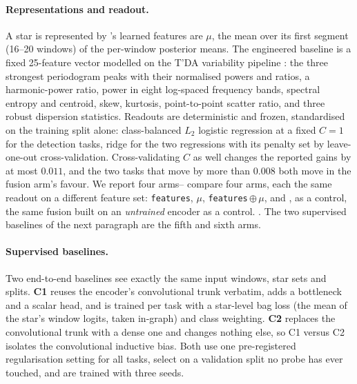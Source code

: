 \documentclass{article}
\providecommand{\DIFaddtex}[1]{{\protect\color{blue} \sf #1}} %
\providecommand{\DIFdeltex}[1]{{\protect\color{red} \scriptsize #1}} %
\providecommand{\DIFaddbegin}{} %
\providecommand{\DIFaddend}{} %
\providecommand{\DIFdelbegin}{} %
\providecommand{\DIFdelend}{} %
\providecommand{\DIFadd}[1]{\texorpdfstring{\DIFaddtex{#1}}{#1}} %
\providecommand{\DIFdel}[1]{\texorpdfstring{\DIFdeltex{#1}}{}} %
\providecommand{\DIFscaledelfig}{0.5}
\newlength{\DIFdelgraphicswidth} %
\newlength{\DIFdelgraphicsheight} %
\providecommand{\DIFaddincludegraphics}[2][]{{\color{blue}\fbox{\DIFOincludegraphics[#1]{#2}}}} %
\providecommand{\DIFdelincludegraphics}[2][]{%
\sbox{\DIFdelgraphicsbox}{\DIFOincludegraphics[#1]{#2}}%
\settoboxwidth{\DIFdelgraphicswidth}{\DIFdelgraphicsbox} %
\settoboxtotalheight{\DIFdelgraphicsheight}{\DIFdelgraphicsbox} %
\scalebox{\DIFscaledelfig}{%
\parbox[b]{\DIFdelgraphicswidth}{\usebox{\DIFdelgraphicsbox}\\[-\baselineskip] \rule{\DIFdelgraphicswidth}{0em}}\llap{\resizebox{\DIFdelgraphicswidth}{\DIFdelgraphicsheight}{%
\setlength{\unitlength}{\DIFdelgraphicswidth}%
\begin{picture}(1,1)%
\thicklines\linethickness{2pt} %
{\color[rgb]{1,0,0}\put(0,0){\framebox(1,1){}}}%
{\color[rgb]{1,0,0}\put(0,0){\line( 1,1){1}}}%
{\color[rgb]{1,0,0}\put(0,1){\line(1,-1){1}}}%
\end{picture}%
}\hspace*{3pt}}} %
} %
\DeclareRobustCommand{\DIFaddbegin}{\DIFOaddbegin \let\includegraphics\DIFaddincludegraphics} %
\DeclareRobustCommand{\DIFaddend}{\DIFOaddend \let\includegraphics\DIFOincludegraphics} %
\DeclareRobustCommand{\DIFdelbegin}{\DIFOdelbegin \let\includegraphics\DIFdelincludegraphics} %
\DeclareRobustCommand{\DIFdelend}{\DIFOaddend \let\includegraphics\DIFOincludegraphics} %
\begin{document}
\paragraph{Representations and readout.} A star\DIFdelbegin \DIFdel{is represented by }\DIFdelend \DIFaddbegin \DIFadd{'s learned features are }\DIFaddend $\mu$, the mean over its first
segment (16--20 windows) of the per-window posterior means. The engineered baseline is a fixed
25-feature vector modelled on the T'DA variability pipeline \citep{audenaert2021}: the three
strongest periodogram peaks with their normalised powers and ratios, a harmonic-power ratio, power in
eight log-spaced frequency bands, spectral entropy and centroid, skew, kurtosis, point-to-point
scatter ratio, and three robust dispersion statistics. Readouts are deterministic and frozen,
standardised on the training split alone: class-balanced $L_{2}$ logistic regression at a fixed
$C = 1$ for the detection tasks, ridge for the two regressions with its penalty set by leave-one-out
cross-validation. Cross-validating $C$ as well changes the reported gains by at most $0.011$, and the
two tasks that move by more than $0.008$ both move in the fusion arm's favour. We \DIFdelbegin \DIFdel{report four
arms-- }\DIFdelend \DIFaddbegin \DIFadd{compare four
arms, each the same readout on a different feature set: }\DIFaddend \texttt{features}, $\mu$,
\texttt{features}\,$\oplus\,\mu$, and\DIFaddbegin \DIFadd{, as a control, }\DIFaddend the same fusion built on an \emph{untrained}
encoder\DIFdelbegin \DIFdel{as a control. }\DIFdelend \DIFaddbegin \DIFadd{. The two supervised baselines of the next paragraph are the fifth and sixth arms.
}\DIFaddend 

\paragraph{Supervised baselines.} Two end-to-end baselines see exactly the same input windows, star
sets and splits. \textbf{C1} reuses the encoder's convolutional trunk verbatim, adds a bottleneck and
a scalar head, and is trained per task with a star-level bag loss (the mean of the star's window
logits, taken in-graph) and class weighting. \textbf{C2} replaces the convolutional trunk with a
dense one and changes nothing else, so C1 versus C2 isolates the convolutional inductive bias. Both
use one pre-registered regularisation setting for all tasks, select on a validation split no probe
has ever touched, and are trained with three seeds.
\end{document}
